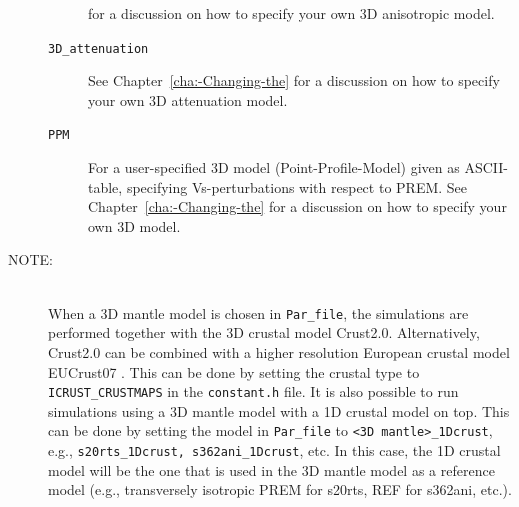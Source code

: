 \documentclass[oneside,english]{book}
\begin{document}
\begin{description}
\begin{description}
for a discussion on how to specify your own 3D anisotropic model.
\item [{\texttt{3D\_attenuation}}] See Chapter~\ref{cha:-Changing-the}
for a discussion on how to specify your own 3D attenuation model.
\item [{\texttt{PPM}}] For a user-specified 3D model (Point-Profile-Model)
given as ASCII-table, specifying Vs-perturbations
with respect to PREM. See Chapter~\ref{cha:-Changing-the}
for a discussion on how to specify your own 3D model.
\end{description}
\item [{\textmd{NOTE:}}]~\\
When a 3D mantle model is chosen in \texttt{Par\_file}, the simulations are performed together with the 3D crustal model Crust2.0. Alternatively, Crust2.0 can be combined with a higher resolution European crustal model EUCrust07 \citep{EUCrust07}. This can be done by setting the crustal type to \texttt{ICRUST\_CRUSTMAPS} in the \texttt{constant.h} file.
It is also possible to run simulations using a 3D mantle model with a 1D crustal model on top. This can be done by setting the model in \texttt{Par\_file} to \texttt{<3D mantle>\_1Dcrust}, e.g., \texttt{s20rts\_1Dcrust, s362ani\_1Dcrust}, etc. In this case, the 1D crustal model will be the one that is used in the 3D mantle model as a reference model (e.g., transversely isotropic PREM for s20rts, REF for s362ani, etc.).


\end{description}
\end{document}
